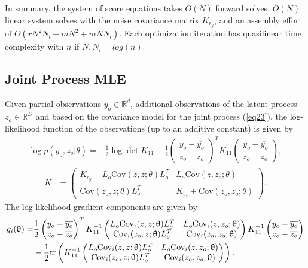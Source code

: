 \documentclass[article,ij4uq]{ij4uq}              %
\begin{document}
\par In summary, the system of score equations takes $O(N)$ forward solves, $O(N)$ linear system solves with the noise covariance matrix $K_{\epsilon_{y}}$,  and an assembly effort of $O(rN^2N_{l}+mN^{2}+mNN_{l})$. Each optimization iteration has quasilinear time complexity with $n$ if $N,N_{l}=log(n)$. 

\subsection{Joint Process MLE}\label{sec:42}
\par Given partial observations $y_{o}\in\mathbb{R}^{d}$, additional observations of the latent process $z_{o}\in\mathbb{R}^{D}$ and based on the covariance model for the joint process (\ref{eq23}), the log-likelihood function of the observations (up to an additive constant) is given by
\begin{align}
    \log{p(y_{o},z_{o}|\theta)}=-\frac{1}{2}\log{\det{K_{11}}}-\frac{1}{2}\begin{pmatrix}y_{o}-\overline{y_{o}} \\ z_{o}-\overline{z_{o}}\end{pmatrix}^{T}K_{11}\begin{pmatrix}y_{o}-\overline{y_{o}}\\ z_{o}-\overline{z_{o}}\end{pmatrix},\label{eq49}
\end{align}
\begin{align}
    K_{11}=\begin{pmatrix}K_{\epsilon_{y}}+L_{o}\mathrm{Cov}(z,z;\theta)L_{o}^{T} & L_{o}\mathrm{Cov}(z,z_{o};\theta)\\\mathrm{Cov}(z_{o},z;\theta)L_{o}^{T} & K_{\epsilon_{z}}+\mathrm{Cov}(z_{o},z_{o};\theta)\end{pmatrix}.\label{eq50}
\end{align}
The log-likelihood gradient components are given by
\begin{align}
    g_{i}(\theta)=&\frac{1}{2}\begin{pmatrix}y_{o}-\overline{y_{o}}\\ z_{o}-\overline{z_{o}}\end{pmatrix}^{T}K_{11}^{-1}\begin{pmatrix}L_{o}\mathrm{Cov}_{i}(z,z;\theta)L_{o}^{T} & L_{o}\mathrm{Cov}_{i}(z,z_{o};\theta)\\\mathrm{Cov}_{i}(z_{o},z;\theta)L_{o}^{T} & \mathrm{Cov}_{i}(z_{o},z_{o};\theta)\end{pmatrix}K_{11}^{-1}\begin{pmatrix}y_{o}-\overline{y_{o}}\\ z_{o}-\overline{z_{o}}\end{pmatrix}\notag\\
    &-\frac{1}{2}\mathrm{tr}\left(K_{11}^{-1}\begin{pmatrix}L_{o}\mathrm{Cov}_{i}(z,z;\theta)L_{o}^{T} & L_{o}\mathrm{Cov}_{i}(z,z_{o};\theta)\\\mathrm{Cov}_{i}(z_{o},z;\theta)L_{o}^{T} & \mathrm{Cov}_{i}(z_{o},z_{o};\theta)\end{pmatrix}\right).\label{eq51}
\end{align}
\end{document}
